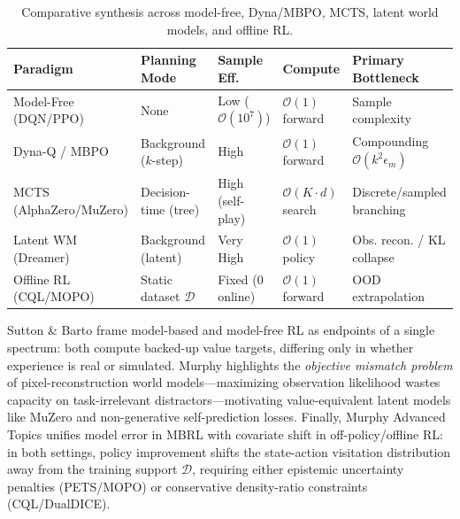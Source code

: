 \documentclass[../../../../master.tex]{subfiles}
\begin{document}
\begin{table}[htbp]
\centering
\small
\caption{Comparative synthesis across model-free, Dyna/MBPO, MCTS, latent world models, and offline RL.}
\label{tab:mbrl:comparison}
\begin{tabularx}{\textwidth}{@{}l >{\raggedright\arraybackslash}p{2.2cm} l >{\raggedright\arraybackslash}p{2.0cm} >{\raggedright\arraybackslash}X@{}}
\toprule
\textbf{Paradigm} & \textbf{Planning Mode} & \textbf{Sample Eff.} & \textbf{Compute} & \textbf{Primary Bottleneck} \\
\midrule
Model-Free (DQN/PPO) & None & Low ($\mathcal{O}(10^7)$) & $\mathcal{O}(1)$ forward & Sample complexity \\
Dyna-Q / MBPO & Background ($k$-step) & High & $\mathcal{O}(1)$ forward & Compounding $\mathcal{O}(k^2\epsilon_m)$ \\
MCTS (AlphaZero/MuZero) & Decision-time (tree) & High (self-play) & $\mathcal{O}(K \cdot d)$ search & Discrete/sampled branching \\
Latent WM (Dreamer) & Background (latent) & Very High & $\mathcal{O}(1)$ policy & Obs. recon. / KL collapse \\
Offline RL (CQL/MOPO) & Static dataset $\mathcal{D}$ & Fixed ($0$ online) & $\mathcal{O}(1)$ forward & OOD extrapolation \\
\bottomrule
\end{tabularx}
\end{table}

\begin{crossbook}
Sutton \& Barto  frame model-based and model-free RL as endpoints of a single spectrum: both compute backed-up value targets, differing only in whether experience is real or simulated. Murphy  highlights the \emph{objective mismatch problem} of pixel-reconstruction world models---maximizing observation likelihood wastes capacity on task-irrelevant distractors---motivating value-equivalent latent models like MuZero  and non-generative self-prediction losses. Finally, Murphy Advanced Topics  unifies model error in MBRL with covariate shift in off-policy/offline RL: in both settings, policy improvement shifts the state-action visitation distribution away from the training support $\mathcal{D}$, requiring either epistemic uncertainty penalties (PETS/MOPO) or conservative density-ratio constraints (CQL/DualDICE).
\end{crossbook}
\end{document}

